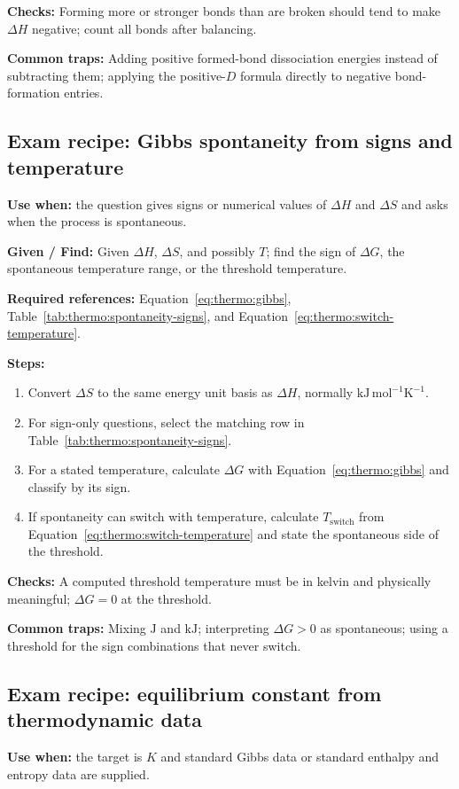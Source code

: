 \textbf{Checks:} Forming more or stronger bonds than are broken should tend to make \(\Delta H\) negative; count all bonds after balancing.

\textbf{Common traps:} Adding positive formed-bond dissociation energies instead of subtracting them; applying the positive-\(D\) formula directly to negative bond-formation entries.

\subsection{Exam recipe: Gibbs spontaneity from signs and temperature}
\textbf{Use when:} the question gives signs or numerical values of \(\Delta H\) and \(\Delta S\) and asks when the process is spontaneous.

\textbf{Given / Find:} Given \(\Delta H\), \(\Delta S\), and possibly \(T\); find the sign of \(\Delta G\), the spontaneous temperature range, or the threshold temperature.

\textbf{Required references:} Equation~\eqref{eq:thermo:gibbs}, Table~\ref{tab:thermo:spontaneity-signs}, and Equation~\eqref{eq:thermo:switch-temperature}.

\textbf{Steps:}
\begin{enumerate}
    \item Convert \(\Delta S\) to the same energy unit basis as \(\Delta H\), normally \(\mathrm{kJ\,mol^{-1}K^{-1}}\).
    \item For sign-only questions, select the matching row in Table~\ref{tab:thermo:spontaneity-signs}.
    \item For a stated temperature, calculate \(\Delta G\) with Equation~\eqref{eq:thermo:gibbs} and classify by its sign.
    \item If spontaneity can switch with temperature, calculate \(T_{\mathrm{switch}}\) from Equation~\eqref{eq:thermo:switch-temperature} and state the spontaneous side of the threshold.
\end{enumerate}

\textbf{Checks:} A computed threshold temperature must be in kelvin and physically meaningful; \(\Delta G=0\) at the threshold.

\textbf{Common traps:} Mixing \(\mathrm{J}\) and \(\mathrm{kJ}\); interpreting \(\Delta G>0\) as spontaneous; using a threshold for the sign combinations that never switch.

\subsection{Exam recipe: equilibrium constant from thermodynamic data}
\textbf{Use when:} the target is \(K\) and standard Gibbs data or standard enthalpy and entropy data are supplied.

